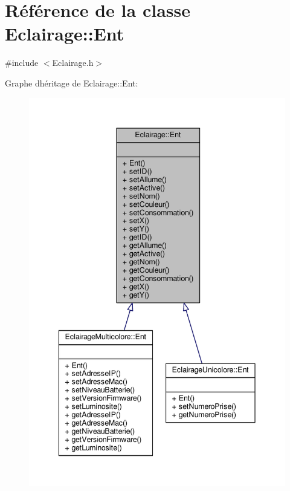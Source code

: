 \hypertarget{classEclairage_1_1Ent}{}\section{Référence de la classe Eclairage\+:\+:Ent}
\label{classEclairage_1_1Ent}


{\ttfamily \#include $<$Eclairage.\+h$>$}



Graphe d\textquotesingle{}héritage de Eclairage\+:\+:Ent\+:
\nopagebreak
\begin{figure}[H]
\begin{center}
\leavevmode
\includegraphics[width=342pt]{classEclairage_1_1Ent__inherit__graph}
\end{center}
\end{figure}


